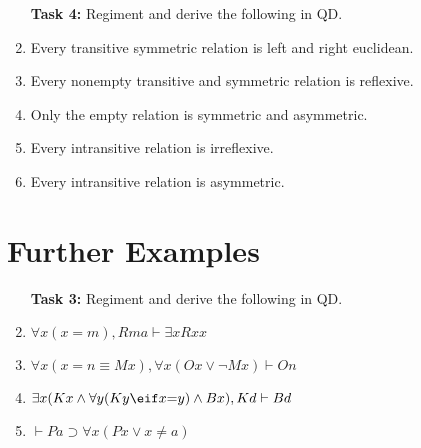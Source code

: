 \documentclass[a4paper, 11pt]{article} %
\newcommand{\qt}[2]{#1 #2} %
\begin{document}
\begin{enumerate}
  \item[\bf Task 4:] Regiment and derive the following in QD.
  \item Every transitive symmetric relation is left and right euclidean.
  \item Every nonempty transitive and symmetric relation is reflexive.
  \item Only the empty relation is symmetric and asymmetric.
  \item Every intransitive relation is irreflexive.
  \item Every intransitive relation is asymmetric.
\end{enumerate}






\section*{Further Examples}

\begin{enumerate}
  \item[\bf Task 3:] Regiment and derive the following in QD.
  \item $\qt{\forall}{x}(x = m), Rma\vdash \qt{\exists}{x} Rxx$
  \item $\qt{\forall}{x}(x{=}n \equiv Mx), \qt{\forall}{x}(Ox \vee \neg Mx)\vdash On$
  \item $\qt{\exists}{x}(Kx \wedge \qt{\forall}{y}(Ky \eif x{=}y) \wedge Bx), Kd\vdash Bd$
  \item $\vdash Pa \supset \qt{\forall}{x}(Px \vee x {\neq} a)$
\end{enumerate}
\end{document}

